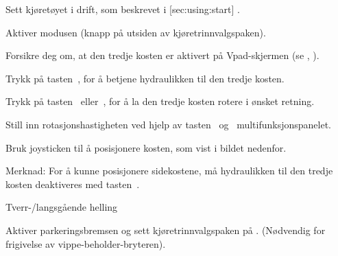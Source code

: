 

\startsection [title={Arbeide med den tredje kosten (valgfritt)},
reference={sec:using:frontBrush},
]

\startSteps
\item Sett kjøretøyet i drift, som beskrevet i [sec:using:start] .
\item Aktiver modusen (knapp på utsiden av kjøretrinnvalgspaken).
\stopSteps


\startSteps [continue]
\item Forsikre deg om, at den tredje kosten er aktivert på Vpad-skjermen (se  , ).
\item Trykk på tasten~, for å betjene hydraulikken til den tredje kosten.
\item Trykk på tasten~ eller~, for å la den tredje kosten rotere i ønsket retning.

\item Still inn rotasjonshastigheten ved hjelp av tasten~ og~ multifunksjonspanelet.

\item Bruk joysticken til å posisjonere kosten, som vist i bildet nedenfor.

\stopSteps

{\md Merknad:} {\lt For å kunne posisjonere sidekostene, må hydraulikken til den tredje kosten deaktiveres med tasten~.}
\vfill

\start
\setupcombinations [width=\textwidth]

{
{}{Tverr-/langsgående helling}
\stopcombination}
\stop



\stopsection



\item Aktiver parkeringsbremsen og sett kjøretrinnvalgspaken på . (Nødvendig for frigivelse av vippe-beholder-bryteren).



